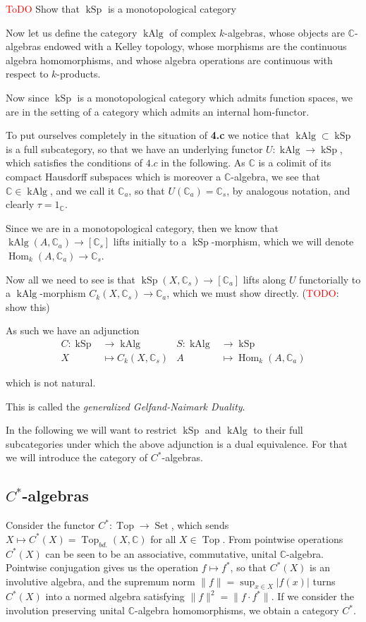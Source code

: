 \documentclass[12pt,a4paper]{article}
\DeclareMathOperator{\Hom}{Hom}
\DeclareMathOperator{\Set}{Set}
\DeclareMathOperator{\Top}{Top}
\DeclareMathOperator{\kSp}{kSp}
\DeclareMathOperator{\kAlg}{kAlg}
\begin{document}
\textcolor{red}{ToDO} Show that $\kSp$ is a monotopological category

Now let us define the category $\kAlg$ of complex $k$-algebras, whose objects are $\mathbb{C}$-algebras endowed with a Kelley topology, whose morphisms are the continuous algebra homomorphisms, and whose algebra operations are continuous with respect to $k$-products. 

Now since $\kSp$ is a monotopological category which admits function spaces, we are in the setting of a category which admits an internal hom-functor. 

To put ourselves completely in the situation of \textbf{4.c} we notice that $\kAlg \subset \kSp$ is a full subcategory, so that we have an underlying functor $U: \kAlg \to \kSp$, which satisfies the conditions of $4.c$ in the following. As $\mathbb{C}$ is a colimit of its compact Hausdorff subspaces which is moreover a $\mathbb{C}$-algebra, we see that $\mathbb{C} \in \kAlg$, and we call it $\mathbb{C}_a$,  so that $U(\mathbb{C}_a) = \mathbb{C}_s$, by analogous notation, and clearly $\tau = 1_{\mathbb{C}}. $

Since  we are in a monotopological category, then we know that $\kAlg(A, \mathbb{C}_a) \to [\mathbb{C}_s]$
lifts initially to a $\kSp$-morphism, which we will denote $\Hom_k(A, \mathbb{C}_a) \to \mathbb{C}_s$.

Now all we need to see is that $\kSp(X,\mathbb{C}_s) \to [\mathbb{C}_a]$ lifts along $U$ functorially to a $\kAlg$-morphism $C_k(X, \mathbb{C}_s) \to \mathbb{C}_a$, which we must show directly. (\textcolor{red}{TODO}: show this)

As such we have an adjunction 
\begin{align*}
	C: \kSp & \to \kAlg &  S: \kAlg & \to \kSp\\
	X &\mapsto C_k(X, \mathbb{C}_s) & A &\mapsto \Hom_k(A, \mathbb{C}_a)
\end{align*}

which is not natural.

This is called the \emph{generalized Gelfand-Naimark Duality}. 

In the following we will want to restrict $\kSp$ and $\kAlg$ to their full subcategories under which the above adjunction is a dual equivalence. For that we will introduce the category of $C^*$-algebras.
\subsection{$C^*$-algebras}
Consider the functor $C^*: \Top \to \Set$, which sends  $X \mapsto C^*(X) = \Top_{bd.}(X, \mathbb{C})$ for all $X \in \Top$. 
From pointwise operations $C^*(X)$ can be seen to be an associative, commutative, unital $\mathbb{C}$-algebra. Pointwise conjugation gives us the operation $f \mapsto f^*$, so that $C^*(X)$ is an involutive algebra, and the supremum norm $\lVert f \lVert = \sup_{x \in X}\lvert f(x)\lvert $ turns $C^*(X)$ into a normed algebra satisfying $\lVert f \lVert^2 = \lVert f \cdot f^* \lVert$. If we consider the involution preserving unital $\mathbb{C}$-algebra homomorphisms, we obtain a category $C^*$.
\end{document}
